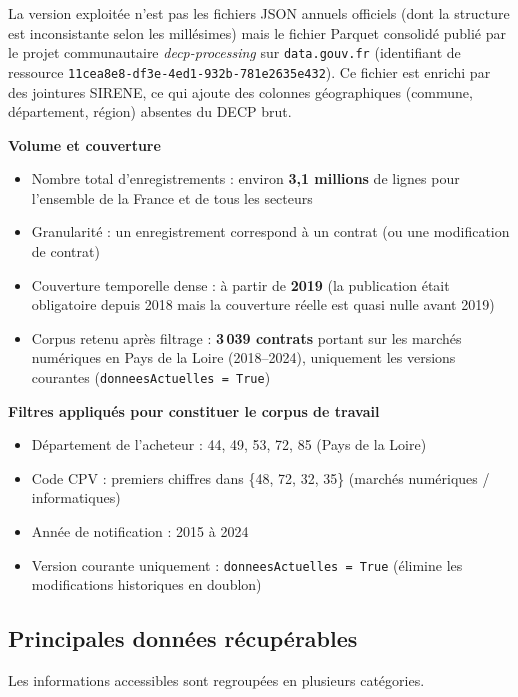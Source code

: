 \documentclass[12pt,a4paper]{article}
\newcommand{\breakcode}[1]{\nolinkurl{#1}}
\begin{document}
La version exploitée n'est pas les fichiers JSON annuels officiels (dont la
structure est inconsistante selon les millésimes) mais le fichier Parquet
consolidé publié par le projet communautaire \textit{decp-processing} sur
\breakcode{data.gouv.fr} (identifiant de ressource
\breakcode{11cea8e8-df3e-4ed1-932b-781e2635e432}).
Ce fichier est enrichi par des jointures SIRENE, ce qui ajoute des colonnes
géographiques (commune, département, région) absentes du DECP brut.

\medskip
\textbf{Volume et couverture}

\begin{itemize}
  \item[---] Nombre total d'enregistrements : environ \textbf{3,1 millions} de
    lignes pour l'ensemble de la France et de tous les secteurs
  \item[---] Granularité : un enregistrement correspond à un contrat (ou une
    modification de contrat)
  \item[---] Couverture temporelle dense : à partir de \textbf{2019} (la
    publication était obligatoire depuis 2018 mais la couverture réelle est
    quasi nulle avant 2019)
  \item[---] Corpus retenu après filtrage : \textbf{3\,039 contrats} portant
    sur les marchés numériques en Pays de la Loire (2018--2024), uniquement
    les versions courantes (\texttt{donneesActuelles = True})
\end{itemize}

\medskip
\textbf{Filtres appliqués pour constituer le corpus de travail}

\begin{itemize}
  \item[---] Département de l'acheteur : 44, 49, 53, 72, 85 (Pays de la Loire)
  \item[---] Code CPV : premiers chiffres dans \{48, 72, 32, 35\}
    (marchés numériques / informatiques)
  \item[---] Année de notification : 2015 à 2024
  \item[---] Version courante uniquement : \texttt{donneesActuelles = True}
    (élimine les modifications historiques en doublon)
\end{itemize}

\subsection{Principales données récupérables}

Les informations accessibles sont regroupées en plusieurs catégories.
\end{document}
